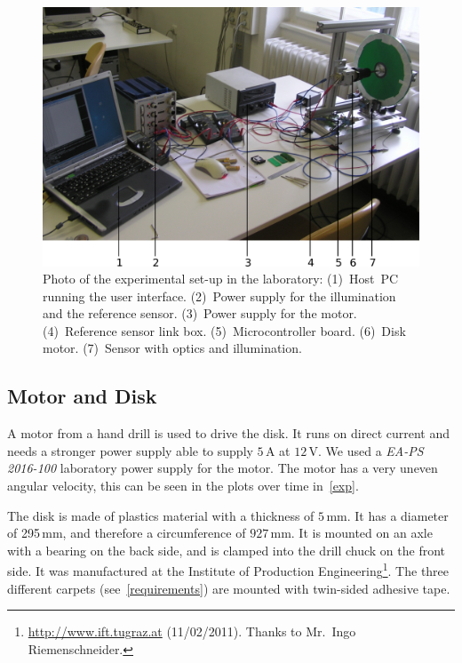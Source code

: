 \documentclass[12pt,a4paper]{article}
\begin{document}
\begin{figure}[htbp]
\begin{center}
\includegraphics[width=\textwidth]{figures/testbed-photo.pdf}
\caption{\label{fig:testbed-photo}
Photo of the experimental set-up in the laboratory:
(1)~Host~PC running the user interface.
(2)~Power supply for the illumination and the reference sensor.
(3)~Power supply for the motor.
(4)~Reference sensor link box.
(5)~Microcontroller board.
(6)~Disk motor.
(7)~Sensor with optics and illumination.
}
\end{center}
\end{figure}





\subsection{Motor and Disk}

A motor from a hand drill is used to drive the disk.
It runs on direct current and needs a stronger power supply able to supply $5\,$A at $12\,$V.
We used a \emph{EA-PS 2016-100} laboratory power supply for the motor.
The motor has a very uneven angular velocity, this can be seen in the plots over time in~\autoref{exp}.

The disk is made of plastics material with a thickness of $5\,$mm.
It has a diameter of 295\,mm, and therefore a circumference of $927\,$mm.
It is mounted on an axle with a bearing on the back side, and is clamped into the drill chuck on the front side.
It was manufactured at the Institute of Production Engineering\footnote{\url{http://www.ift.tugraz.at} (11/02/2011). Thanks to Mr.\ Ingo Riemenschneider.}.
The three different carpets (see~\autoref{requirements}) are mounted with twin-sided adhesive tape.
\end{document}
